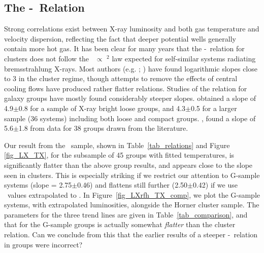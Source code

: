 \documentclass[usenatbib]{mn2e}
\begin{document}
\subsection{The \LX-\TX\ Relation}
\label{subsec_LT}

Strong correlations exist between X-ray luminosity and both gas temperature and
velocity dispersion, reflecting the fact that deeper potential wells generally
contain more hot gas.  It has been clear for many years that the \LX-\TX\
relation for clusters does not follow the \LX\ $\propto$ \TX$^2$ law expected for
self-similar systems radiating bremsstrahlung X-rays.  Most authors
(e.g. \citealt*{white97b}; \citealt{arnaud99}) have found logarithmic slopes
close to 3 in the cluster regime, though attempts to remove the effects of
central cooling flows \citep{allen98,markevitch98} have produced rather flatter
relations.  Studies of the relation for galaxy groups have mostly found
considerably steeper slopes.  \citet{helsdon00a,helsdon00b} obtained a slope of
4.9$\pm$0.8 for a sample of X-ray bright loose groups, and 4.3$\pm$0.5 for a
larger sample (36 systems) including both loose and compact groups.
\citet{xue00}, found a slope of 5.6$\pm$1.8 from data for 38 groups drawn from
the literature.

Our result from the \GEMS\ sample, shown in Table~\ref{tab_relations} and Figure
\ref{fig_LX_TX}, for the subsample of 45 groups with fitted temperatures, is
significantly flatter than the above group results, and appears close to the
slope seen in clusters.  This is especially striking if we restrict our
attention to G-sample systems (slope = 2.75$\pm$0.46) and flattens still further
(2.50$\pm$0.42) if we use \LX\ values extrapolated to \rfh.  In
Figure~\ref{fig_LXrfh_TX_comp}, we plot the G-sample systems, with extrapolated
luminosities, alongside the Horner cluster sample.  The parameters for the three
trend lines are given in Table~\ref{tab_comparison}, and that for the G-sample
groups is actually somewhat {\it flatter} than the cluster relation.  Can we
conclude from this that the earlier results of a steeper \LX-\TX\ relation in
groups were incorrect?


\end{document}
